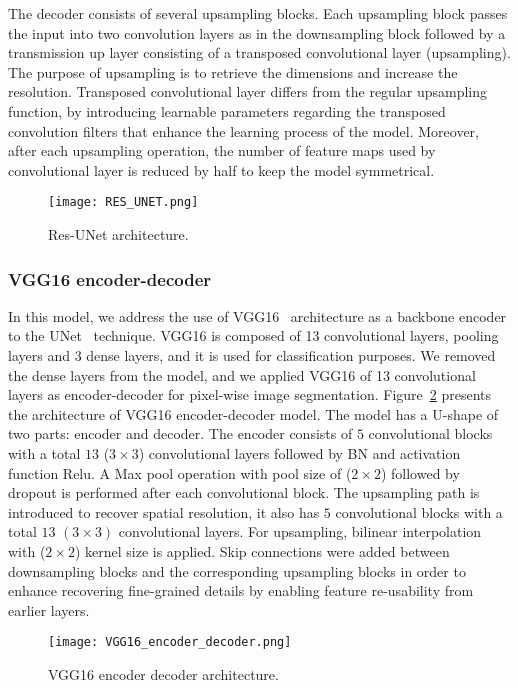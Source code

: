 The decoder consists of several upsampling blocks. 
Each upsampling block passes the input into two convolution layers as in the downsampling block followed by a transmission up layer consisting of a transposed convolutional layer (upsampling). 
The purpose of upsampling is to retrieve the dimensions and increase the resolution.
Transposed convolutional layer differs from the regular upsampling function, by introducing learnable parameters regarding the transposed convolution filters that enhance the learning process of the model. 
Moreover, after each upsampling operation, the number of feature maps used by convolutional layer is reduced by half to keep the model symmetrical. 
\begin{figure} [h!]
	\begin{center}
		\texttt{[image: RES\_UNET.png]}
	\end{center}
	\caption{Res-UNet architecture.} 
	\label{fig:Unet}
\end{figure}
\subsubsection{VGG16 encoder-decoder}
In this model, we address the use of VGG16~\cite{Simonyan2015} architecture as a backbone encoder to the UNet~\cite{Ronneberger2015} technique.
VGG16 is composed of 13 convolutional layers, pooling layers and \(3\) dense layers, and it is used for classification purposes.
We removed the dense layers from the model, and we applied VGG16 of 13 convolutional layers as encoder-decoder for pixel-wise image segmentation.
Figure~\ref{vgg16} presents the architecture of VGG16 encoder-decoder model. 
The model has a U-shape of two parts: encoder and decoder.
The encoder consists of \(5\) convolutional blocks with a total \(13\)  (\(3\times3\)) convolutional layers followed by BN and activation function Relu.
A Max pool operation with pool size of (\(2\times2\)) followed by dropout is performed after each convolutional block.  
The upsampling path is introduced to recover spatial resolution, it also has \(5\) convolutional blocks with a total \(13\) \((3\times 3)\) convolutional layers.
For upsampling, bilinear interpolation with (\(2\times2\)) kernel size is applied.
Skip connections were added between downsampling blocks and the corresponding upsampling blocks in order to enhance recovering fine-grained details by enabling feature re-usability from earlier layers.
\begin{figure} [h!]
	\begin{center}
		\texttt{[image: VGG16\_encoder\_decoder.png]}
	\end{center}
	\caption{VGG16 encoder decoder architecture.} 
	\label{vgg16}
\end{figure}
